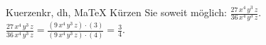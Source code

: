 \begin{MAufgabe}{Kuerzen}{kr, dh, MaTeX}
K\"urzen Sie soweit m\"oglich: $\frac{27\, x^4\, y^3\, z}{36\, x^4\, y^3\, z}$.\\ 
\ifLsg\MLoesung
\quad $\frac{27\, x^4\, y^3\, z}{36\, x^4\, y^3\, z}=\frac{(9\, x^4\, y^3\, z)\cdot(3)}{(9\, x^4\, y^3\, z)\cdot(4)}=\frac{3}{4}$.\else\relax\fi
 \end{MAufgabe}